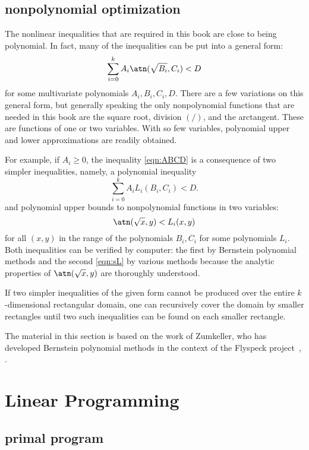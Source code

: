 \subsection{nonpolynomial optimization}

The nonlinear inequalities that are required in this book are close to
being polynomial.  In fact, many  of the inequalities can be put into a
general form:
\begin{equation}\label{eqn:ABCD}
\sum_{i=0}^k A_i \atn(\sqrt{B_i},C_i) < D
\end{equation}
for some multivariate polynomials $A_i,B_i,C_i,D$.  There are a few
variations on this general form, but generally speaking the only
nonpolynomial functions that are needed in this book are the square
root, division $(/)$, and the arctangent.  These are functions of one
or two variables.  With so few variables, polynomial upper and lower
approximations are readily obtained.

For example, if $A_i\ge 0$, the inequality \eqref{eqn:ABCD} is a
consequence of two simpler inequalities, namely,  a polynomial inequality
\[
\sum_{i=0}^k A_i L_i(B_i,C_i) < D.
\]
and polynomial upper bounds to nonpolynomial functions in two variables:
\begin{equation}\label{eqn:sL}
\atn(\sqrt{x},y) < L_i(x,y)
\end{equation}
for all $(x,y)$ in the range of the polynomials $B_i,C_i$ for some
polynomials $L_i$.   Both inequalities can be verified by computer: the first
by Bernstein polynomial methods and the second
 \eqref{eqn:sL}  by various methods because 
the analytic properties of $\atn(\sqrt{x},y)$ are thoroughly
understood.

If two simpler inequalities of the given form cannot be produced over
the entire $k$-dimensional rectangular domain, one can recursively
cover the domain by smaller rectangles until two such inequalities can
be found on each smaller rectangle.

The material in this section is based on the work of Zumkeller, who
has developed Bernstein polynomial methods in the context of the
Flyspeck project~\cite{roland-thesis}, \cite{zumkeller-nonlinear}.


\section{Linear Programming}\label{sec:lp}

\subsection{primal program}

